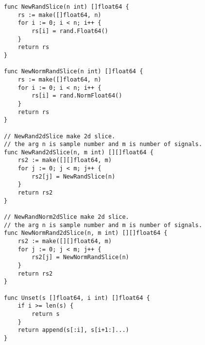 \begin{lstlisting}[caption=misc.go,label=misc.go]
func NewRandSlice(n int) []float64 {
	rs := make([]float64, n)
	for i := 0; i < n; i++ {
		rs[i] = rand.Float64()
	}
	return rs
}

func NewNormRandSlice(n int) []float64 {
	rs := make([]float64, n)
	for i := 0; i < n; i++ {
		rs[i] = rand.NormFloat64()
	}
	return rs
}

// NewRand2dSlice make 2d slice.
// the arg n is sample number and m is number of signals.
func NewRand2dSlice(n, m int) [][]float64 {
	rs2 := make([][]float64, m)
	for j := 0; j < m; j++ {
		rs2[j] = NewRandSlice(n)
	}
	return rs2
}

// NewRandNorm2dSlice make 2d slice.
// the arg n is sample number and m is number of signals.
func NewNormRand2dSlice(n, m int) [][]float64 {
	rs2 := make([][]float64, m)
	for j := 0; j < m; j++ {
		rs2[j] = NewNormRandSlice(n)
	}
	return rs2
}

func Unset(s []float64, i int) []float64 {
	if i >= len(s) {
		return s
	}
	return append(s[:i], s[i+1:]...)
}
\end{lstlisting}
